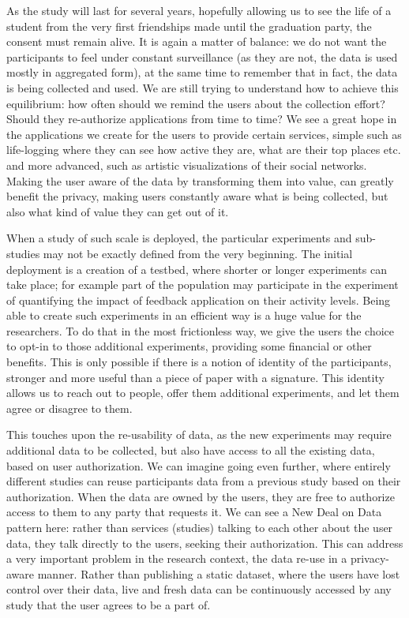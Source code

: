As the study will last for several years, hopefully allowing us to see the life of a student from the very first friendships made until the graduation party, the consent must remain alive.
It is again a matter of balance: we do not want the participants to feel under constant surveillance (as they are not, the data is used mostly in aggregated form), at the same time to remember that in fact, the data is being collected and used.
We are still trying to understand how to achieve this equilibrium: how often should we remind the users about the collection effort? Should they re-authorize applications from time to time?
We see a great hope in the applications we create for the users to provide certain services, simple such as life-logging where they can see how active they are, what are their top places etc. and more advanced, such as artistic visualizations of their social networks.
Making the user aware of the data by transforming them into value, can greatly benefit the privacy, making users constantly aware what is being collected, but also what kind of value they can get out of it.

When a study of such scale is deployed, the particular experiments and sub-studies may not be exactly defined from the very beginning.
The initial deployment is a creation of a testbed, where shorter or longer experiments can take place; for example part of the population may participate in the experiment of quantifying the impact of feedback application on their activity levels.
Being able to create such experiments in an efficient way is a huge value for the researchers. To do that in the most frictionless way, we give the users the choice to opt-in to those additional experiments, providing some financial or other benefits.
This is only possible if there is a notion of identity of the participants, stronger and more useful than a piece of paper with a signature.
This identity allows us to reach out to people, offer them additional experiments, and let them agree or disagree to them.

This touches upon the re-usability of data, as the new experiments may require additional data to be collected, but also have access to all the existing data, based on user authorization.
We can imagine going even further, where entirely different studies can reuse participants data from a previous study based on their authorization.
When the data are owned by the users, they are free to authorize access to them to any party that requests it. We can see a New Deal on Data pattern here: rather than services (studies) talking to each other about the user data, they talk directly to the users, seeking their authorization.
This can address a very important problem in the research context, the data re-use in a privacy-aware manner.
Rather than publishing a static dataset, where the users have lost control over their data, live and fresh data can be continuously accessed by any study that the user agrees to be a part of.

